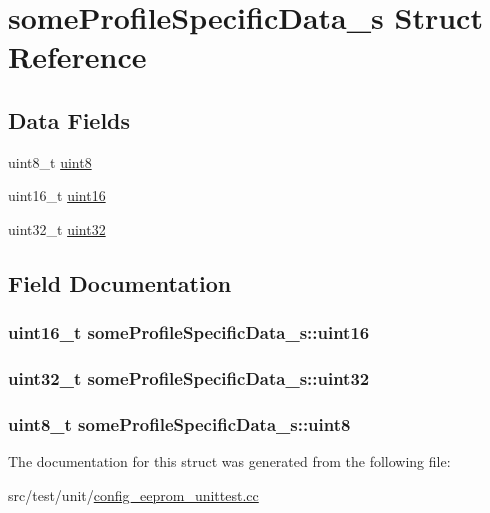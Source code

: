 \hypertarget{structsomeProfileSpecificData__s}{\section{some\+Profile\+Specific\+Data\+\_\+s Struct Reference}
\label{structsomeProfileSpecificData__s}
}
\subsection*{Data Fields}
\begin{DoxyCompactItemize}
\item 
uint8\+\_\+t \hyperlink{structsomeProfileSpecificData__s_ab58f06376b12eca5efecfaa2ba3f7705}{uint8}
\item 
uint16\+\_\+t \hyperlink{structsomeProfileSpecificData__s_a8e69b17c21ec1a4bdbb5570943ca82bd}{uint16}
\item 
uint32\+\_\+t \hyperlink{structsomeProfileSpecificData__s_a3abb3d48438e4de9b0e0b7a606e7077c}{uint32}
\end{DoxyCompactItemize}


\subsection{Field Documentation}
\hypertarget{structsomeProfileSpecificData__s_a8e69b17c21ec1a4bdbb5570943ca82bd}{
\subsubsection[{uint16}]{\setlength{\rightskip}{0pt plus 5cm}uint16\+\_\+t some\+Profile\+Specific\+Data\+\_\+s\+::uint16}}\label{structsomeProfileSpecificData__s_a8e69b17c21ec1a4bdbb5570943ca82bd}
\hypertarget{structsomeProfileSpecificData__s_a3abb3d48438e4de9b0e0b7a606e7077c}{
\subsubsection[{uint32}]{\setlength{\rightskip}{0pt plus 5cm}uint32\+\_\+t some\+Profile\+Specific\+Data\+\_\+s\+::uint32}}\label{structsomeProfileSpecificData__s_a3abb3d48438e4de9b0e0b7a606e7077c}
\hypertarget{structsomeProfileSpecificData__s_ab58f06376b12eca5efecfaa2ba3f7705}{
\subsubsection[{uint8}]{\setlength{\rightskip}{0pt plus 5cm}uint8\+\_\+t some\+Profile\+Specific\+Data\+\_\+s\+::uint8}}\label{structsomeProfileSpecificData__s_ab58f06376b12eca5efecfaa2ba3f7705}


The documentation for this struct was generated from the following file\+:\begin{DoxyCompactItemize}
\item 
src/test/unit/\hyperlink{config__eeprom__unittest_8cc}{config\+\_\+eeprom\+\_\+unittest.\+cc}\end{DoxyCompactItemize}
